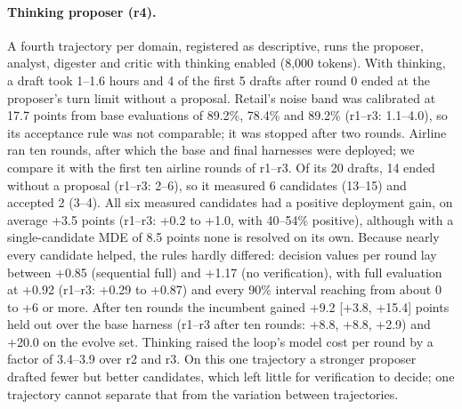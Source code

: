 \documentclass[11pt]{article}
\begin{document}
\paragraph{Thinking proposer (r4).} A fourth trajectory per domain, registered as descriptive, runs the proposer, analyst, digester and critic with thinking enabled (8{,}000 tokens). With thinking, a draft took 1--1.6 hours and 4 of the first 5 drafts after round 0 ended at the proposer's turn limit without a proposal. Retail's noise band was calibrated at 17.7 points from base evaluations of 89.2\%, 78.4\% and 89.2\% (r1--r3: 1.1--4.0), so its acceptance rule was not comparable; it was stopped after two rounds. Airline ran ten rounds, after which the base and final harnesses were deployed; we compare it with the first ten airline rounds of r1--r3. Of its 20 drafts, 14 ended without a proposal (r1--r3: 2--6), so it measured 6 candidates (13--15) and accepted 2 (3--4). All six measured candidates had a positive deployment gain, on average +3.5 points (r1--r3: +0.2 to +1.0, with 40--54\% positive), although with a single-candidate MDE of 8.5 points none is resolved on its own. Because nearly every candidate helped, the rules hardly differed: decision values per round lay between +0.85 (sequential full) and +1.17 (no verification), with full evaluation at +0.92 (r1--r3: +0.29 to +0.87) and every 90\% interval reaching from about 0 to +6 or more. After ten rounds the incumbent gained +9.2 [+3.8, +15.4] points held out over the base harness (r1--r3 after ten rounds: +8.8, +8.8, +2.9) and +20.0 on the evolve set. Thinking raised the loop's model cost per round by a factor of 3.4--3.9 over r2 and r3. On this one trajectory a stronger proposer drafted fewer but better candidates, which left little for verification to decide; one trajectory cannot separate that from the variation between trajectories.
\end{document}
